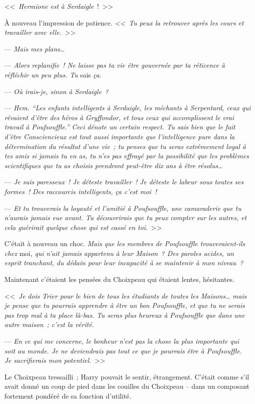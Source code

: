 <<~\emph{Hermione est à Serdaigle}~!~>>

À nouveau l'impression de patience. \emph{<<~Tu peux la retrouver après les cours et travailler avec elle.}~>>

--- \emph{Mais mes plans…}

--- \emph{Alors replanifie~! Ne laisse pas ta vie être gouvernée par ta réticence à réfléchir un peu plus. Tu} sais \emph{ça.}

--- \emph{Où irais-je, sinon à Serdaigle~?}

--- \emph{Hem. “Les enfants intelligents à Serdaigle, les méchants à Serpentard, ceux qui rêvaient d'être des héros à Gryffondor, et tous ceux qui accomplissent le vrai travail à Poufsouffle.” Ceci dénote un certain respect. Tu sais bien que le fait d'être Consciencieux est tout aussi importante que l'intelligence pure dans la détermination du résultat d'une vie~; tu penses que tu seras extrêmement loyal à tes amis si jamais tu en as, tu n'es pas effrayé par la possibilité que les problèmes scientifiques que tu as choisis prendront peut-être dix ans à être résolus…}

--- \emph{Je suis paresseux~! Je déteste travailler~! Je déteste le labeur sous toutes ses formes~! Des raccourcis intelligents, ça c'est moi~!}

--- \emph{Et tu trouverais la loyauté et l'amitié à Poufsouffle, une camaraderie que tu n'aurais jamais eue avant. Tu découvrirais que tu peux compter sur les autres, et cela guérirait quelque chose qui est cassé en toi.}~>>

C'était à nouveau un choc. \emph{Mais que les membres de Poufsouffle trouveraient-ils chez} moi\emph{, qui n'ait jamais appartenu à leur Maison~? Des paroles acides, un esprit tranchant, du dédain pour leur incapacité à se maintenir à mon niveau~?}

Maintenant c'étaient les pensées du Choixpeau qui étaient lentes, hésitantes.

<<~\emph{Je dois Trier pour le bien de tous les étudiants de toutes les Maisons… mais je pense que tu pourrais apprendre à être un bon Poufsouffle, et que tu ne serais pas trop mal à ta place là-bas. Tu seras plus heureux à Poufsouffle que dans une autre maison~; c'est la vérité.}

--- \emph{En ce qui me concerne, le bonheur n'est pas la chose la plus importante qui soit au monde. Je ne deviendrais pas tout ce que je pourrais être à Poufsouffle. Je sacrifierais mon potentiel.}~>>

Le Choixpeau tressailli~; Harry pouvait le sentir, étrangement. C'était comme s'il avait donné un coup de pied dans les couilles du Choixpeau -- dans un composant fortement pondéré de sa fonction d'utilité.

